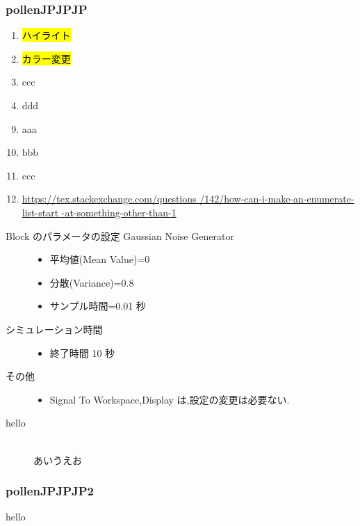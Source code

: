 \documentclass{jsarticle}	       %
\newcommand{\HL}[1]{\hl{\mbox{#1}}}
\begin{document}
			\subsubsection{pollenJPJPJP}
				\begin{enumerate}
					\item \HL{ハイライト}
					\item \HL{カラー変更}
					\item ccc
					\item ddd
				\end{enumerate}
				\begin{enumerate}
					\setcounter{enumi}{8}
					\item aaa
					\item bbb
					\item ccc
					\item \url{https://tex.stackexchange.com/questions
						/142/how-can-i-make-an-enumerate-list-start
						-at-something-other-than-1}
				\end{enumerate}
				\begin{description}
					\item[Block のパラメータの設定 Gaussian Noise Generator]\mbox{}
						\begin{itemize}
							\item 平均値(Mean Value)=0
							\item 分散(Variance)=0.8
							\item サンプル時間=0.01 秒
						\end{itemize}
					\item[シミュレーション時間]\mbox{}
						\begin{itemize}
							\item 終了時間 10 秒
						\end{itemize}
					\item[その他]\mbox{}
						\begin{itemize}
							\item Signal To Workspace,Display は,設定の変更は必要ない.
						\end{itemize}
					\item[hello]\mbox{}\\
						あいうえお
				\end{description}

			\subsubsection{pollenJPJPJP2}
				hello
\end{document}
